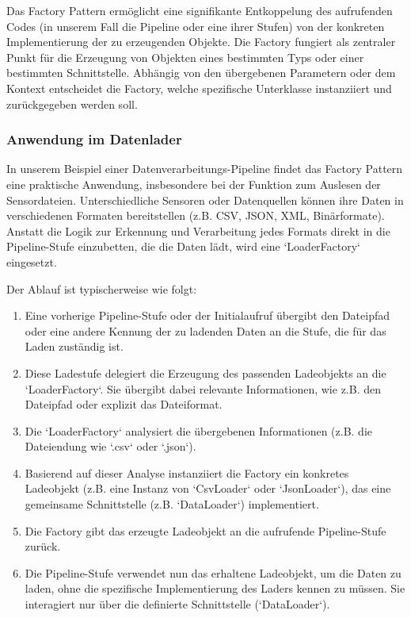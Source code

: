 \documentclass[a4paper]{article} %
\begin{document}
Das Factory Pattern ermöglicht eine signifikante Entkoppelung des aufrufenden Codes (in unserem Fall die Pipeline oder eine ihrer Stufen) von der konkreten Implementierung der zu erzeugenden Objekte. Die Factory fungiert als zentraler Punkt für die Erzeugung von Objekten eines bestimmten Typs oder einer bestimmten Schnittstelle. Abhängig von den übergebenen Parametern oder dem Kontext entscheidet die Factory, welche spezifische Unterklasse instanziiert und zurückgegeben werden soll.

\subsubsection{Anwendung im Datenlader}
In unserem Beispiel einer Datenverarbeitungs-Pipeline findet das Factory Pattern eine praktische Anwendung, insbesondere bei der Funktion zum Auslesen der Sensordateien. Unterschiedliche Sensoren oder Datenquellen können ihre Daten in verschiedenen Formaten bereitstellen (z.B. CSV, JSON, XML, Binärformate). Anstatt die Logik zur Erkennung und Verarbeitung jedes Formats direkt in die Pipeline-Stufe einzubetten, die die Daten lädt, wird eine `LoaderFactory` eingesetzt.

Der Ablauf ist typischerweise wie folgt:
\begin{enumerate}
    \item Eine vorherige Pipeline-Stufe oder der Initialaufruf übergibt den Dateipfad oder eine andere Kennung der zu ladenden Daten an die Stufe, die für das Laden zuständig ist.
    \item Diese Ladestufe delegiert die Erzeugung des passenden Ladeobjekts an die `LoaderFactory`. Sie übergibt dabei relevante Informationen, wie z.B. den Dateipfad oder explizit das Dateiformat.
    \item Die `LoaderFactory` analysiert die übergebenen Informationen (z.B. die Dateiendung wie `.csv` oder `.json`).
    \item Basierend auf dieser Analyse instanziiert die Factory ein konkretes Ladeobjekt (z.B. eine Instanz von `CsvLoader` oder `JsonLoader`), das eine gemeinsame Schnittstelle (z.B. `DataLoader`) implementiert.
    \item Die Factory gibt das erzeugte Ladeobjekt an die aufrufende Pipeline-Stufe zurück.
    \item Die Pipeline-Stufe verwendet nun das erhaltene Ladeobjekt, um die Daten zu laden, ohne die spezifische Implementierung des Laders kennen zu müssen. Sie interagiert nur über die definierte Schnittstelle (`DataLoader`).
\end{enumerate}
\end{document}
